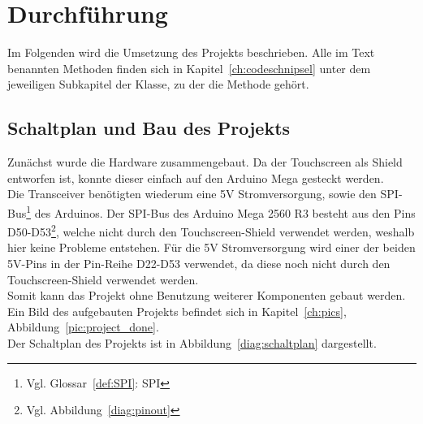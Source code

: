 \documentclass[a4paper, 11pt]{scrartcl}
\begin{document}
\section{Durchführung}
Im Folgenden wird die Umsetzung des Projekts beschrieben. Alle im Text benannten Methoden finden sich in Kapitel~\ref{ch:codeschnipsel} unter dem jeweiligen Subkapitel
der Klasse, zu der die Methode gehört.

\subsection{Schaltplan und Bau des Projekts}
Zunächst wurde die Hardware zusammengebaut. Da der Touchscreen als Shield entworfen ist, konnte dieser einfach auf den Arduino Mega gesteckt werden.
\\
Die Transceiver benötigten wiederum eine 5V Stromversorgung, sowie den SPI-Bus\footnote{Vgl. Glossar~\ref{def:SPI}: SPI} des Arduinos. Der SPI-Bus des Arduino Mega
2560 R3 besteht aus den Pins D50-D53\footnote{Vgl. Abbildung~\ref{diag:pinout}}, welche nicht durch den Touchscreen-Shield verwendet werden, weshalb hier keine Probleme
entstehen. Für die 5V Stromversorgung wird einer der beiden 5V-Pins in der Pin-Reihe D22-D53 verwendet, da diese noch nicht durch den Touchscreen-Shield verwendet werden.
\\
Somit kann das Projekt ohne Benutzung weiterer Komponenten gebaut werden. Ein Bild des aufgebauten Projekts befindet sich in Kapitel~\ref{ch:pics}, Abbildung~\ref{pic:project_done}.
\\
Der Schaltplan des Projekts ist in Abbildung~\ref{diag:schaltplan} dargestellt.
\end{document}
